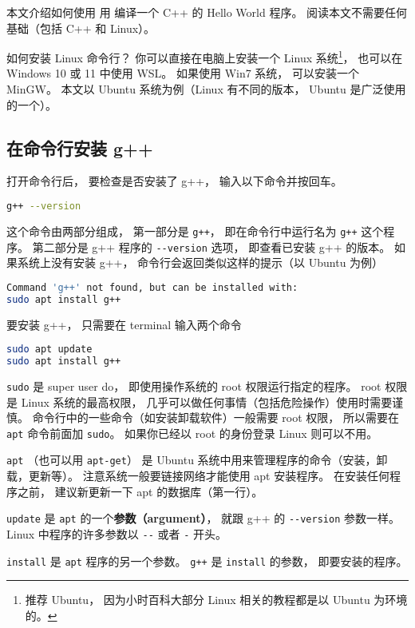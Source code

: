 
本文介绍如何使用 用 编译一个 C++ 的 Hello World 程序。 阅读本文不需要任何基础（包括 C++ 和 Linux）。

如何安装 Linux 命令行？ 你可以直接在电脑上安装一个 Linux 系统\footnote{推荐 Ubuntu， 因为小时百科大部分 Linux 相关的教程都是以 Ubuntu 为环境的。}， 也可以在 Windows 10 或 11 中使用 WSL。 如果使用 Win7 系统， 可以安装一个 MinGW。 本文以 Ubuntu 系统为例（Linux 有不同的版本， Ubuntu 是广泛使用的一个）。

\subsection{在命令行安装 g++}
打开命令行后， 要检查是否安装了 g++， 输入以下命令并按回车。
\begin{lstlisting}[language=bash]
g++ --version
\end{lstlisting}
这个命令由两部分组成， 第一部分是 \verb|g++|， 即在命令行中运行名为 \verb|g++| 这个程序。 第二部分是 g++ 程序的 \verb|--version| 选项， 即查看已安装 g++ 的版本。 如果系统上没有安装 g++， 命令行会返回类似这样的提示（以 Ubuntu 为例）
\begin{lstlisting}[language=bash]
Command 'g++' not found, but can be installed with:
sudo apt install g++
\end{lstlisting}
要安装 g++， 只需要在 terminal 输入两个命令
\begin{lstlisting}[language=bash]
sudo apt update
sudo apt install g++
\end{lstlisting}
\verb|sudo| 是 super user do， 即使用操作系统的 root 权限运行指定的程序。 root 权限是 Linux 系统的最高权限， 几乎可以做任何事情（包括危险操作）使用时需要谨慎。 命令行中的一些命令（如安装卸载软件）一般需要 root 权限， 所以需要在 \verb|apt| 命令前面加 \verb|sudo|。 如果你已经以 root 的身份登录 Linux 则可以不用。

\verb|apt| （也可以用 \verb|apt-get|） 是 Ubuntu 系统中用来管理程序的命令（安装，卸载，更新等）。 注意系统一般要链接网络才能使用 apt 安装程序。 在安装任何程序之前， 建议新更新一下 apt 的数据库（第一行）。

\verb|update| 是 \verb|apt| 的一个\textbf{参数（argument）}， 就跟 g++ 的 \verb|--version| 参数一样。 Linux 中程序的许多参数以 \verb|--| 或者 \verb|-| 开头。

\verb|install| 是 \verb|apt| 程序的另一个参数。 \verb|g++| 是 \verb|install| 的参数， 即要安装的程序。

